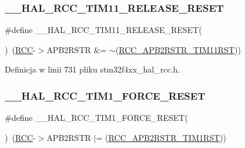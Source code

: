 \subsubsection{\texorpdfstring{\+\_\+\+\_\+\+H\+A\+L\+\_\+\+R\+C\+C\+\_\+\+T\+I\+M11\+\_\+\+R\+E\+L\+E\+A\+S\+E\+\_\+\+R\+E\+S\+ET}{\_\_HAL\_RCC\_TIM11\_RELEASE\_RESET}}
{\footnotesize\ttfamily \#define \+\_\+\+\_\+\+H\+A\+L\+\_\+\+R\+C\+C\+\_\+\+T\+I\+M11\+\_\+\+R\+E\+L\+E\+A\+S\+E\+\_\+\+R\+E\+S\+ET(\begin{DoxyParamCaption}{ }\end{DoxyParamCaption})~(\hyperlink{group___peripheral__declaration_ga74944438a086975793d26ae48d5882d4}{R\+CC}-\/$>$A\+P\+B2\+R\+S\+TR \&= $\sim$(\hyperlink{group___peripheral___registers___bits___definition_ga9651c8201d42ba03bb1bf89d9d39e60c}{R\+C\+C\+\_\+\+A\+P\+B2\+R\+S\+T\+R\+\_\+\+T\+I\+M11\+R\+ST}))}



Definicja w linii 731 pliku stm32f4xx\+\_\+hal\+\_\+rcc.\+h.

\mbox{\label{group___r_c_c___a_p_b2___force___release___reset_gac423d6a52fa42423119844e4a7d68c7b}} 
\subsubsection{\texorpdfstring{\+\_\+\+\_\+\+H\+A\+L\+\_\+\+R\+C\+C\+\_\+\+T\+I\+M1\+\_\+\+F\+O\+R\+C\+E\+\_\+\+R\+E\+S\+ET}{\_\_HAL\_RCC\_TIM1\_FORCE\_RESET}}
{\footnotesize\ttfamily \#define \+\_\+\+\_\+\+H\+A\+L\+\_\+\+R\+C\+C\+\_\+\+T\+I\+M1\+\_\+\+F\+O\+R\+C\+E\+\_\+\+R\+E\+S\+ET(\begin{DoxyParamCaption}{ }\end{DoxyParamCaption})~(\hyperlink{group___peripheral__declaration_ga74944438a086975793d26ae48d5882d4}{R\+CC}-\/$>$A\+P\+B2\+R\+S\+TR $\vert$= (\hyperlink{group___peripheral___registers___bits___definition_ga5bd060cbefaef05487963bbd6c48d7c6}{R\+C\+C\+\_\+\+A\+P\+B2\+R\+S\+T\+R\+\_\+\+T\+I\+M1\+R\+ST}))}



